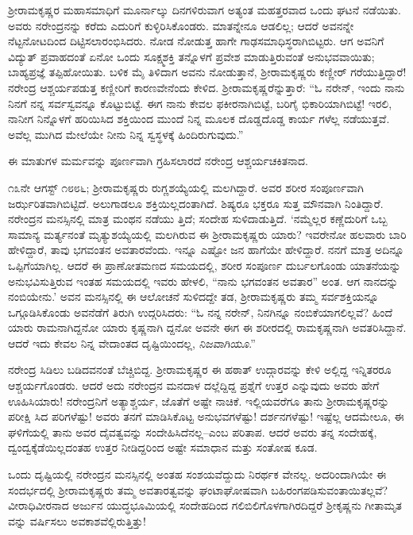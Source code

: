 ಶ್ರೀರಾಮಕೃಷ್ಣರ ಮಹಾಸಮಾಧಿಗೆ ಮೂರ್ನಾಲ್ಕು ದಿನಗಳಿರುವಾಗ ಅತ್ಯಂತ ಮಹತ್ತರವಾದ ಒಂದು ಘಟನೆ ನಡೆಯಿತು. ಅವರು ನರೇಂದ್ರನನ್ನು ಕರೆದು ಎದುರಿಗೆ ಕುಳ್ಳಿರಿಸಿಕೊಂಡರು. ಮಾತನ್ನೇನೂ ಆಡಲಿಲ್ಲ; ಆದರೆ ಅವನನ್ನೇ ನೆಟ್ಟನೋಟದಿಂದ ದಿಟ್ಟಿಸಲಾರಂಭಿಸಿದರು. ನೋಡ ನೋಡುತ್ತ ಹಾಗೇ ಗಾಢಸಮಾಧಿಸ್ಥರಾಗಿಬಿಟ್ಟರು. ಆಗ ಅವನಿಗೆ ವಿದ್ಯುತ್ ಪ್ರವಾಹದಂತೆ ಏನೋ ಒಂದು ಸೂಕ್ಷ್ಮಶಕ್ತಿ ತನ್ನೊಳಗೆ ಪ್ರವೇಶ ಮಾಡುತ್ತಿರುವಂತೆ ಅನುಭವವಾಯಿತು; ಬಾಹ್ಯಪ್ರಜ್ಞೆ ತಪ್ಪಿಹೋಯಿತು. ಬಳಿಕ ಮೈ ತಿಳಿದಾಗ ಅವನು ನೋಡುತ್ತಾನೆ, ಶ್ರೀರಾಮಕೃಷ್ಣರು ಕಣ್ಣೀರ್ ಗರೆಯುತ್ತಿದ್ದಾರೆ! ನರೇಂದ್ರ ಆಶ್ಚರ್ಯಪಡುತ್ತ ಕಣ್ಣೀರಿಗೆ ಕಾರಣವೇನೆಂದು ಕೇಳಿದ. ಶ್ರೀರಾಮಕೃಷ್ಣರೆನ್ನುತ್ತಾರೆ: “ಓ ನರೇನ್, ಇಂದು ನಾನು ನಿನಗೆ ನನ್ನ ಸರ್ವಸ್ವವನ್ನೂ ಕೊಟ್ಟುಬಿಟ್ಟೆ. ಈಗ ನಾನು ಕೇವಲ ಫಕೀರನಾಗಿಬಿಟ್ಟೆ, ಬರಿಗೈ ಭಿಕಾರಿಯಾಗಿಬಿಟ್ಟೆ! ಇರಲಿ, ನಾನೀಗ ನಿನ್ನೊಳಗೆ ಹರಿಯಿಸಿದ ಶಕ್ತಿಯಿಂದ ಮುಂದೆ ನಿನ್ನ ಮೂಲಕ ದೊಡ್ಡದೊಡ್ಡ ಕಾರ್ಯ ಗಳೆಲ್ಲ ನಡೆಯುತ್ತವೆ. ಅವೆಲ್ಲ ಮುಗಿದ ಮೇಲೆಯೇ ನೀನು ನಿನ್ನ ಸ್ವಸ್ಥಳಕ್ಕೆ ಹಿಂದಿರುಗುವುದು.”

ಈ ಮಾತುಗಳ ಮರ್ಮವನ್ನು ಪೂರ್ಣವಾಗಿ ಗ್ರಹಿಸಲಾರದೆ ನರೇಂದ್ರ ಆಶ್ಚರ್ಯಚಕಿತನಾದ.

೧೩ನೇ ಆಗಸ್ಟ್ ೧೮೮೬; ಶ್ರೀರಾಮಕೃಷ್ಣರು ರುಗ್ಣಶಯ್ಯೆಯಲ್ಲಿ ಮಲಗಿದ್ದಾರೆ. ಅವರ ಶರೀರ ಸಂಪೂರ್ಣವಾಗಿ ಜರ್ಝರಿತವಾಗಿಬಿಟ್ಟಿದೆ. ಅಲುಗಾಡಲೂ ಶಕ್ತಿಯಿಲ್ಲದಂತಾಗಿದೆ. ಶಿಷ್ಯರೂ ಭಕ್ತರೂ ಸುತ್ತ ಮೌನವಾಗಿ ನಿಂತಿದ್ದಾರೆ. ನರೇಂದ್ರನ ಮನಸ್ಸಿನಲ್ಲಿ ಮಾತ್ರ ಮಂಥನ ನಡೆಯು ತ್ತಿದೆ; ಸಂದೇಹ ಸುಳಿದಾಡುತ್ತಿದೆ. ‘ನಮ್ಮೆಲ್ಲರ ಕಣ್ಣೆದುರಿಗೆ ಒಬ್ಬ ಸಾಮಾನ್ಯ ಮರ್ತ್ಯನಂತೆ ಮೃತ್ಯುಶಯ್ಯೆಯಲ್ಲಿ ಮಲಗಿರುವ ಈ ಶ್ರೀರಾಮಕೃಷ್ಣರು ಯಾರು? ಇವರೇನೋ ಹಲವಾರು ಬಾರಿ ಹೇಳಿದ್ದಾರೆ, ತಾವು ಭಗವಂತನ ಅವತಾರವೆಂದು. ಇನ್ನೂ ಎಷ್ಟೋ ಜನ ಹಾಗೆಯೇ ಹೇಳಿದ್ದಾರೆ. ನನಗೆ ಮಾತ್ರ ಅದಿನ್ನೂ ಒಪ್ಪಿಗೆಯಾಗಿಲ್ಲ. ಆದರೆ ಈ ಪ್ರಾಣೋತ­ಮಣದ ಸಮಯದಲ್ಲಿ, ಶರೀರ ಸಂಪೂರ್ಣ ದುರ್ಬಲಗೊಂಡು ಯಾತನೆಯನ್ನು ಅನುಭವಿಸುತ್ತಿರುವ ಇಂತಹ ಸಮಯದಲ್ಲಿ ಇವರು ಹೇಳಲಿ, “ನಾನು ಭಗವಂತನ ಅವತಾರ” ಅಂತ. ಆಗ ನಾನದನ್ನು ನಂಬಿಯೇನು.’ ಅವನ ಮನಸ್ಸಿನಲ್ಲಿ ಈ ಆಲೋಚನೆ ಸುಳಿದದ್ದೇ ತಡ, ಶ್ರೀರಾಮಕೃಷ್ಣರು ತಮ್ಮ ಸರ್ವಶಕ್ತಿಯನ್ನೂ ಒಗ್ಗೂಡಿಸಿಕೊಂಡು ಅವನೆಡೆಗೆ ತಿರುಗಿ ಉದ್ಗರಿಸಿದರು: “ಓ ನನ್ನ ನರೇನ್, ನಿನಗಿನ್ನೂ ನಂಬಿಕೆಯಾಗಲಿಲ್ಲವೆ? ಹಿಂದೆ ಯಾರು ರಾಮನಾಗಿದ್ದನೋ ಯಾರು ಕೃಷ್ಣನಾಗಿ ದ್ದನೋ ಅವನೇ ಈಗ ಈ ಶರೀರದಲ್ಲಿ ರಾಮಕೃಷ್ಣನಾಗಿ ಅವತರಿಸಿದ್ದಾನೆ. ಆದರೆ ಇದು ಕೇವಲ ನಿನ್ನ ವೇದಾಂತದ ದೃಷ್ಟಿಯಿಂದಲ್ಲ, \textit{ನಿಜವಾಗಿಯೂ}.”

ನರೇಂದ್ರ ಸಿಡಿಲು ಬಡಿದವನಂತೆ ಬೆಚ್ಚಿಬಿದ್ದ. ಶ್ರೀರಾಮಕೃಷ್ಣರ ಈ ಹಠಾತ್ ಉದ್ಗಾರವನ್ನು ಕೇಳಿ ಅಲ್ಲಿದ್ದ ಇನ್ನಿತರರೂ ಆಶ್ಚರ್ಯಗೊಂಡರು. ಆದರೆ ಅದು ನರೇಂದ್ರನ ಮನದಾಳ ದಲ್ಲೆದ್ದಿದ್ದ ಪ್ರಶ್ನೆಗೆ ಉತ್ತರ ಎನ್ನುವುದು ಅವರು ಹೇಗೆ ಊಹಿಸಿಯಾರು! ನರೇಂದ್ರನಿಗೆ ಅತ್ಯಾಶ್ಚರ್ಯ, ಜೊತೆಗೆ ಅಷ್ಟೇ ನಾಚಿಕೆ. ಇಲ್ಲಿಯವರೆಗೂ ತಾನು ಶ್ರೀರಾಮಕೃಷ್ಣರನ್ನು ಪರೀಕ್ಷಿ ಸಿದ ಪರಿಗಳೆಷ್ಟು! ಅವರು ತನಗೆ ಮಾಡಿಸಿಕೊಟ್ಟ ಅನುಭವಗಳೆಷ್ಟು! ದರ್ಶನಗಳೆಷ್ಟು! ಇಷ್ಟೆಲ್ಲ ಆದಮೇಲೂ, ಈ ಘಳಿಗೆಯಲ್ಲಿ ತಾನು ಅವರ ದೈವತ್ವವನ್ನು ಸಂದೇಹಿಸಿದೆನಲ್ಲ–ಎಂಬ ಪರಿತಾಪ. ಆದರೆ ಅವರು ತನ್ನ ಸಂದೇಹಕ್ಕೆ, ದ್ವಂದ್ವಕ್ಕೆಡೆಯಿಲ್ಲದಂತಹ ಉತ್ತರ ನೀಡಿದ್ದರಿಂದ ಅಷ್ಟೇ ಸಮಾಧಾನ ಮತ್ತು ಸಂತೋಷ ಕೂಡ.

ಒಂದು ದೃಷ್ಟಿಯಲ್ಲಿ ನರೇಂದ್ರನ ಮನಸ್ಸಿನಲ್ಲಿ ಅಂತಹ ಸಂಶಯವೆದ್ದುದು ನಿರರ್ಥಕ ವೇನಲ್ಲ. ಅದರಿಂದಾಗಿಯೇ ಈ ಸಂದರ್ಭದಲ್ಲಿ ಶ್ರೀರಾಮಕೃಷ್ಣರು ತಮ್ಮ ಅವತಾರತ್ವವನ್ನು ಘಂಟಾಘೋಷವಾಗಿ ಬಹಿರಂಗಪಡಿಸುವಂತಾಯಿತಲ್ಲವೆ? ವೀರಾಧಿವೀರನಾದ ಅರ್ಜುನ ಯುದ್ಧಭೂಮಿಯಲ್ಲಿ ಸಂದೇಹದಿಂದ ಗಲಿಬಿಲಿಗೊಳಗಾಗಿರದಿದ್ದರೆ ಶ್ರೀಕೃಷ್ಣನು ಗೀತಾಮೃತ ವನ್ನು ವರ್ಷಿಸಲು ಅವಕಾಶವೆಲ್ಲಿರುತ್ತಿತ್ತು!

